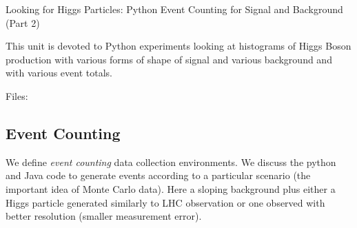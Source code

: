 Looking for Higgs Particles: Python Event Counting for Signal and
Background (Part 2)


This unit is devoted to Python experiments looking at histograms of
Higgs Boson production with various forms of shape of signal and various
background and with various event totals.


Files:









\subsection{Event Counting}

We define \textit{event counting} data collection environments. We discuss
the python and Java code to generate events according to a particular
scenario (the important idea of Monte Carlo data). Here a sloping
background plus either a Higgs particle generated similarly to LHC
observation or one observed with better resolution (smaller measurement
error).


